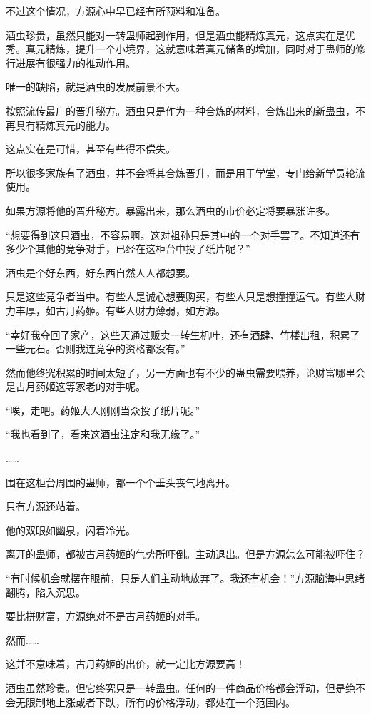\begin{this_body}
不过这个情况，方源心中早已经有所预料和准备。

酒虫珍贵，虽然只能对一转蛊师起到作用，但是酒虫能精炼真元，这点实在是优秀。真元精炼，提升一个小境界，这就意味着真元储备的增加，同时对于蛊师的修行进展有很强力的推动作用。

唯一的缺陷，就是酒虫的发展前景不大。

按照流传最广的晋升秘方。酒虫只是作为一种合炼的材料，合炼出来的新蛊虫，不再具有精炼真元的能力。

这点实在是可惜，甚至有些得不偿失。

所以很多家族有了酒虫，并不会将其合炼晋升，而是用于学堂，专门给新学员轮流使用。

如果方源将他的晋升秘方。暴露出来，那么酒虫的市价必定将要暴涨许多。

“想要得到这只酒虫，不容易啊。这对祖孙只是其中的一个对手罢了。不知道还有多少个其他的竞争对手，已经在这柜台中投了纸片呢？”

酒虫是个好东西，好东西自然人人都想要。

只是这些竞争者当中。有些人是诚心想要购买，有些人只是想撞撞运气。有些人财力丰厚，如古月药姬。有些人财力薄弱，如方源。

“幸好我夺回了家产，这些天通过贩卖一转生机叶，还有酒肆、竹楼出租，积累了一些元石。否则我连竞争的资格都没有。”

然而他终究积累的时间太短了，另一方面也有不少的蛊虫需要喂养，论财富哪里会是古月药姬这等家老的对手呢。

“唉，走吧。药姬大人刚刚当众投了纸片呢。”

“我也看到了，看来这酒虫注定和我无缘了。”

……

围在这柜台周围的蛊师，都一个个垂头丧气地离开。

只有方源还站着。

他的双眼如幽泉，闪着冷光。

离开的蛊师，都被古月药姬的气势所吓倒。主动退出。但是方源怎么可能被吓住？

“有时候机会就摆在眼前，只是人们主动地放弃了。我还有机会！”方源脑海中思绪翻腾，陷入沉思。

要比拼财富，方源绝对不是古月药姬的对手。

然而……

这并不意味着，古月药姬的出价，就一定比方源要高！

酒虫虽然珍贵。但它终究只是一转蛊虫。任何的一件商品价格都会浮动，但是绝不会无限制地上涨或者下跌，所有的价格浮动，都处在一个范围内。


\end{this_body}

